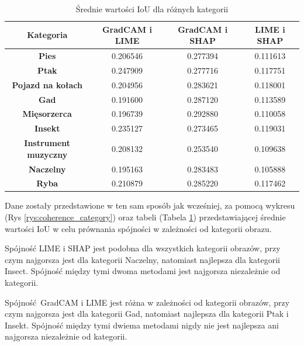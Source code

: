 \begin{table}[h]
	\centering
	\begin{tabular}{|c|c|c|c|}
		\hline
		\textbf{Kategoria}           & \textbf{GradCAM i LIME} & \textbf{GradCAM i SHAP} & \textbf{LIME i SHAP} \\
		\hline
		\textbf{Pies}                & 0.206546                & 0.277394                & 0.111613             \\
		\hline
		\textbf{Ptak}                & 0.247909                & 0.277716                & 0.117751             \\
		\hline
		\textbf{Pojazd na kołach}    & 0.204956                & 0.283621                & 0.118001             \\
		\hline
		\textbf{Gad}                 & 0.191600                & 0.287120                & 0.113589             \\
		\hline
		\textbf{Mięsorzerca}         & 0.196739                & 0.292880                & 0.110058             \\
		\hline
		\textbf{Insekt}              & 0.235127                & 0.273465                & 0.119031             \\
		\hline
		\textbf{Instrument muzyczny} & 0.208132                & 0.253540                & 0.109638             \\
		\hline
		\textbf{Naczelny}            & 0.195163                & 0.283483                & 0.105888             \\
		\hline
		\textbf{Ryba}                & 0.210879                & 0.285220                & 0.117462             \\
		\hline
	\end{tabular}
	\caption{Średnie wartości IoU dla różnych kategorii}
	\label{tab:base_coherence_categories}
\end{table}

Dane zostały przedstawione w ten sam sposób jak wcześniej, za pomocą wykresu (Rys \ref{rys:coherence_category}) oraz tabeli (Tabela \ref{tab:base_coherence_categories}) przedstawiającej średnie wartości IoU w celu prównania spójności w zależności od kategorii obrazu.

Spójność LIME i SHAP jest podobna dla wszystkich kategorii obrazów, przy czym najgorsza jest dla kategorii Naczelny, natomiast najlepsza dla kategorii Insect.
Spójność między tymi dwoma metodami jest najgorsza niezależnie od kategorii.

Spójność GradCAM i LIME jest różna w zależności od kategorii obrazów, przy czym najgorsza jest dla kategorii Gad, natomiast najlepsza dla kategorii Ptak i Insekt.
Spójność między tymi dwiema metodami nigdy nie jest najlepsza ani najgorsza niezależnie od kategorii.

